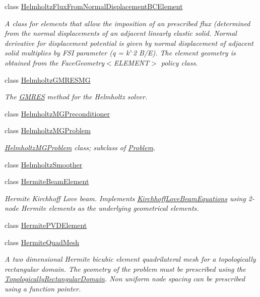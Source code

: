\begin{DoxyCompactItemize}
class \hyperlink{classoomph_1_1HelmholtzFluxFromNormalDisplacementBCElement}{Helmholtz\+Flux\+From\+Normal\+Displacement\+B\+C\+Element}
\begin{DoxyCompactList}\small\item\em A class for elements that allow the imposition of an prescribed flux (determined from the normal displacements of an adjacent linearly elastic solid. Normal derivative for displacement potential is given by normal displacement of adjacent solid multiplies by F\+SI parameter (q = k$^\wedge$2 B/E). The element geometry is obtained from the Face\+Geometry$<$\+E\+L\+E\+M\+E\+N\+T$>$ policy class. \end{DoxyCompactList}\item 
class \hyperlink{classoomph_1_1HelmholtzGMRESMG}{Helmholtz\+G\+M\+R\+E\+S\+MG}
\begin{DoxyCompactList}\small\item\em The \hyperlink{classoomph_1_1GMRES}{G\+M\+R\+ES} method for the Helmholtz solver. \end{DoxyCompactList}\item 
class \hyperlink{classoomph_1_1HelmholtzMGPreconditioner}{Helmholtz\+M\+G\+Preconditioner}
\item 
class \hyperlink{classoomph_1_1HelmholtzMGProblem}{Helmholtz\+M\+G\+Problem}
\begin{DoxyCompactList}\small\item\em \hyperlink{classoomph_1_1HelmholtzMGProblem}{Helmholtz\+M\+G\+Problem} class; subclass of \hyperlink{classoomph_1_1Problem}{Problem}. \end{DoxyCompactList}\item 
class \hyperlink{classoomph_1_1HelmholtzSmoother}{Helmholtz\+Smoother}
\item 
class \hyperlink{classoomph_1_1HermiteBeamElement}{Hermite\+Beam\+Element}
\begin{DoxyCompactList}\small\item\em Hermite Kirchhoff Love beam. Implements \hyperlink{classoomph_1_1KirchhoffLoveBeamEquations}{Kirchhoff\+Love\+Beam\+Equations} using 2-\/node Hermite elements as the underlying geometrical elements. \end{DoxyCompactList}\item 
class \hyperlink{classoomph_1_1HermitePVDElement}{Hermite\+P\+V\+D\+Element}
\item 
class \hyperlink{classoomph_1_1HermiteQuadMesh}{Hermite\+Quad\+Mesh}
\begin{DoxyCompactList}\small\item\em A two dimensional Hermite bicubic element quadrilateral mesh for a topologically rectangular domain. The geometry of the problem must be prescribed using the \hyperlink{classoomph_1_1TopologicallyRectangularDomain}{Topologically\+Rectangular\+Domain}. Non uniform node spacing can be prescribed using a function pointer. \end{DoxyCompactList}\item 

\end{DoxyCompactItemize}

